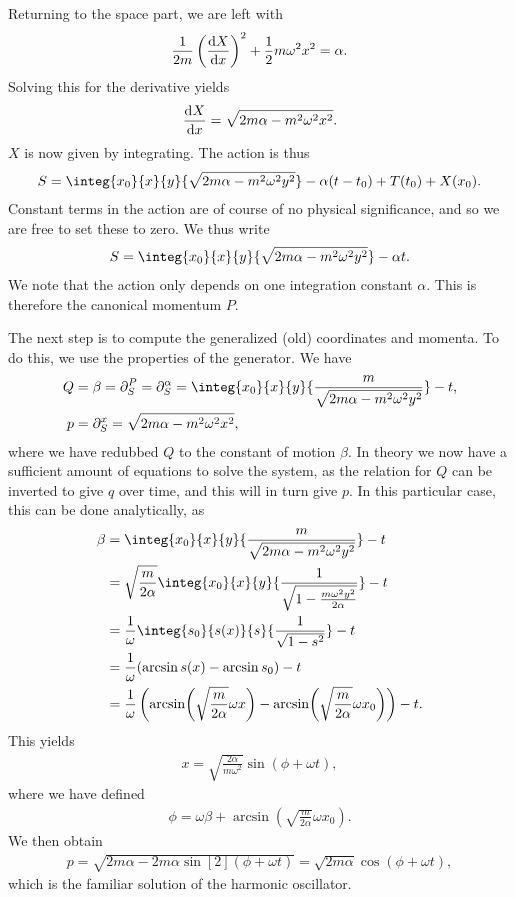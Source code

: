 Returning to the space part, we are left with
\begin{align*}
	\frac{1}{2m}\left(\dv{X}{x}\right)^{2} + \frac{1}{2}m\omega^{2}x^{2} = \alpha.
\end{align*}
Solving this for the derivative yields
\begin{align*}
	\dv{X}{x} = \sqrt{2m\alpha - m^{2}\omega^{2}x^{2}}.
\end{align*}
$X$ is now given by integrating. The action is thus
\begin{align*}
	S = \integ{x_{0}}{x}{y}{\sqrt{2m\alpha - m^{2}\omega^{2}y^{2}}} - \alpha(t - t_{0}) + T(t_{0}) + X(x_{0}).
\end{align*}
Constant terms in the action are of course of no physical significance, and so we are free to set these to zero. We thus write
\begin{align*}
	S = \integ{x_{0}}{x}{y}{\sqrt{2m\alpha - m^{2}\omega^{2}y^{2}}} - \alpha t.
\end{align*}
We note that the action only depends on one integration constant $\alpha$. This is therefore the canonical momentum $P$.

The next step is to compute the generalized (old) coordinates and momenta. To do this, we use the properties of the generator. We have
\begin{align*}
	Q &= \beta = \del{P}{S} = \del{\alpha}{S} = \integ{x_{0}}{x}{y}{\frac{m}{\sqrt{2m\alpha - m^{2}\omega^{2}y^{2}}}} - t, \\
	p &= \del{x}{S} = \sqrt{2m\alpha - m^{2}\omega^{2}x^{2}},
\end{align*}
where we have redubbed $Q$ to the constant of motion $\beta$. In theory we now have a sufficient amount of equations to solve the system, as the relation for $Q$ can be inverted to give $q$ over time, and this will in turn give $p$. In this particular case, this can be done analytically, as
\begin{align*}
	\beta &= \integ{x_{0}}{x}{y}{\frac{m}{\sqrt{2m\alpha - m^{2}\omega^{2}y^{2}}}} - t \\
	      &= \sqrt{\frac{m}{2\alpha}}\integ{x_{0}}{x}{y}{\frac{1}{\sqrt{1 - \frac{m\omega^{2}y^{2}}{2\alpha}}}} - t \\
	      &= \frac{1}{\omega}\integ{s_{0}}{s(x)}{s}{\frac{1}{\sqrt{1 - s^{2}}}} - t \\
	      &= \frac{1}{\omega}(\arcsin{s(x)} - \arcsin{s_{0}}) - t \\
	      &= \frac{1}{\omega}\left(\arcsin(\sqrt{\frac{m}{2\alpha}}\omega x) - \arcsin(\sqrt{\frac{m}{2\alpha}}\omega x_{0})\right) - t.
\end{align*}
This yields
\begin{align*}
	x = \sqrt{\frac{2\alpha}{m\omega^{2}}}\sin(\phi + \omega t),
\end{align*}
where we have defined
\begin{align*}
	\phi = \omega\beta + \arcsin(\sqrt{\frac{m}{2\alpha}}\omega x_{0}).
\end{align*}
We then obtain
\begin{align*}
	p = \sqrt{2m\alpha - 2m\alpha\sin[2](\phi + \omega t)} = \sqrt{2m\alpha}\cos(\phi + \omega t),
\end{align*}
which is the familiar solution of the harmonic oscillator.

